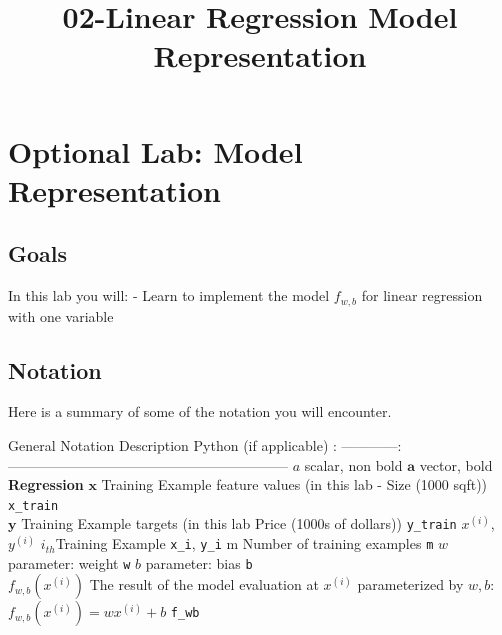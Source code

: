 \documentclass[11pt]{article}
\title{02-Linear Regression Model Representation}
\begin{document}
    
    \maketitle
    
    

    
    \hypertarget{optional-lab-model-representation}{%
\section{Optional Lab: Model
Representation}\label{optional-lab-model-representation}}

    \hypertarget{goals}{%
\subsection{Goals}\label{goals}}

In this lab you will: - Learn to implement the model \(f_{w,b}\) for
linear regression with one variable

    \hypertarget{notation}{%
\subsection{Notation}\label{notation}}

Here is a summary of some of the notation you will encounter.

\textbar General Notation \textbar{} Description\textbar{} Python (if
applicable) \textbar{} \textbar: ------------\textbar:
------------------------------------------------------------\textbar\textbar{}
\textbar{} \(a\) \textbar{} scalar, non bold \textbar\textbar{}
\textbar{} \(\mathbf{a}\) \textbar{} vector, bold \textbar\textbar{}
\textbar{} \textbf{Regression} \textbar{} \textbar{} \textbar{}
\textbar{} \textbar{} \(\mathbf{x}\) \textbar{} Training Example feature
values (in this lab - Size (1000 sqft)) \textbar{} \texttt{x\_train}
\textbar{}\\
\textbar{} \(\mathbf{y}\) \textbar{} Training Example targets (in this
lab Price (1000s of dollars)) \textbar{} \texttt{y\_train} \textbar{}
\(x^{(i)}\), \(y^{(i)}\) \textbar{} \(i_{th}\)Training Example
\textbar{} \texttt{x\_i}, \texttt{y\_i}\textbar{} \textbar{} m
\textbar{} Number of training examples \textbar{} \texttt{m}\textbar{}
\textbar{} \(w\) \textbar{} parameter: weight \textbar{} \texttt{w}
\textbar{} \textbar{} \(b\) \textbar{} parameter: bias \textbar{}
\texttt{b} \textbar{}\\
\textbar{} \(f_{w,b}(x^{(i)})\) \textbar{} The result of the model
evaluation at \(x^{(i)}\) parameterized by \(w,b\):
\(f_{w,b}(x^{(i)}) = wx^{(i)}+b\) \textbar{} \texttt{f\_wb} \textbar{}
\end{document}
